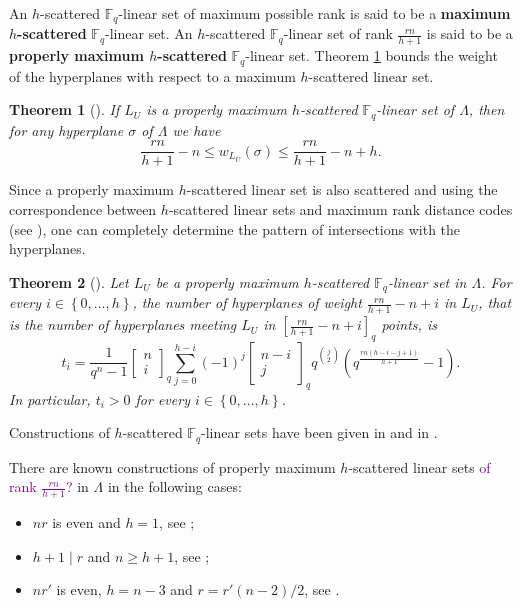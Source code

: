 \documentclass[11pt]{amsart}
\newtheorem{theorem}{Theorem}[section]
\newcommand{\F}{{\mathbb F}}
\newcommand\qbin[3]{\left[\begin{matrix} #1 \\ #2 \end{matrix} \right]_{#3}}
\newcommand{\sam}[1]{\textcolor{purple}{#1}}
\begin{document}
An $h$-scattered $\F_q$-linear set of maximum possible rank is said to be a \textbf{maximum $h$-scattered} $\F_q$-linear set.
An $h$-scattered $\F_q$-linear set of rank $\frac{rn}{h+1}$ is said to be a \textbf{properly maximum $h$-scattered} $\F_q$-linear set.
Theorem \ref{th:inter} bounds the weight of the hyperplanes with respect to a maximum $h$-scattered linear set.

\begin{theorem}[{\cite[Theorem 2.7]{csajbok2021generalising}}]
 \label{th:inter}
If $L_U$ is a properly maximum $h$-scattered $\F_q$-linear set of $\Lambda$, then for any hyperplane $\sigma$ of $\Lambda$ we have
\[
 \frac{rn}{h+1}-n\leq w_{L_{U}}(\sigma) \leq \frac{rn}{h+1}-n+h.
\]
\end{theorem}

Since a properly maximum $h$-scattered linear set is also scattered and using the correspondence between $h$-scattered linear sets and maximum rank distance codes (see \cite{lunardon2017mrd,1930-5346_2019_0_108,sheekey2016new,sheekeyVdV,zini2021scattered}), one can completely determine the pattern of intersections with the hyperplanes.

\begin{theorem}[{\cite[Theorem 7.1]{zini2021scattered}}]
\label{th:intersectionhyper}
Let $L_U$ be a properly maximum $h$-scattered $\F_q$-linear set in $\Lambda$.
For every $i\in\left\{0,\ldots,h\right\}$, the number of hyperplanes of weight $\frac{rn}{h+1}-n+i$ in $L_U$, that is the number of hyperplanes meeting $L_{U}$ in $\left[\frac{rn}{h+1}-n+i\right]_q$
points, is
\begin{equation}\label{eq:ti} 
t_i=\frac{1}{q^n-1}{\qbin{n}{i}{q} } \sum_{j=0}^{h-i} (-1)^{j}{\qbin{n-i}{j}{q} } q^{\binom{j}{2}}\left(q^\frac{rn(h-i-j+1)}{h+1}-1\right). 
\end{equation}
In particular, $t_i>0$ for every $i\in\left\{0,\ldots,h\right\}$.
\end{theorem}

Constructions of $h$-scattered $\F_q$-linear sets have been given in \cite{csajbok2021generalising} and in \cite{napolitano2021linear}.

There are known constructions of properly maximum $h$-scattered linear sets \sam{of rank $\frac{rn}{h+1}$?} in $\Lambda$ in the following cases:
\begin{itemize}
    \item[a)] $nr$ is even and $h=1$, see \cite{ball2000linear,bartoli2018maximum,blokhuis2000scattered,csajbok2017maximum};
    \item[b)] $h+1 \mid r$ and $n\geq h+1$, see \cite{csajbok2021generalising,napolitano2021linear};
    \item[c)] $nr'$ is even, $h=n-3$ and $r=r'(n-2)/2$, see \cite{csajbok2021generalising}.
\end{itemize}
\end{document}
